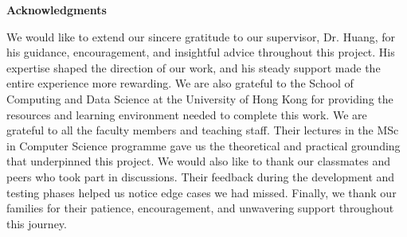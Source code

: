 
\begin{center}
{\fontsize{16}{19}\selectfont\textbf{Acknowledgments}}
\end{center}

\vspace{3mm}

We would like to extend our sincere gratitude to our supervisor, Dr. Huang, for his guidance, encouragement, and insightful advice throughout this project. His expertise shaped the direction of our work, and his steady support made the entire experience more rewarding. We are also grateful to the School of Computing and Data Science at the University of Hong Kong for providing the resources and learning environment needed to complete this work. We are grateful to all the faculty members and teaching staff. Their lectures in the MSc in Computer Science programme gave us the theoretical and practical grounding that underpinned this project. We would also like to thank our classmates and peers who took part in discussions. Their feedback during the development and testing phases helped us notice edge cases we had missed. Finally, we thank our families for their patience, encouragement, and unwavering support throughout this journey.

\newpage
